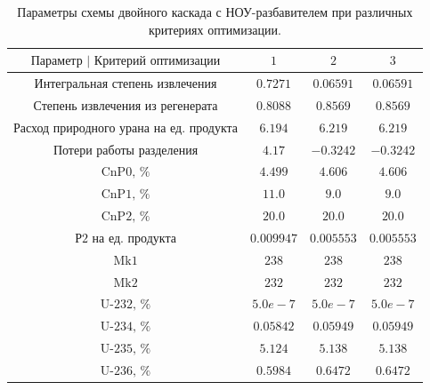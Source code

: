 \begin{table}
    \begin{tabular}{cccc}
        $\text{Параметр | Критерий оптимизации}$ & $\text{1}$ & $\text{2}$ & $\text{3}$\\ \hline
        $\text{Интегральная степень извлечения}$ & $0.7271$ & $0.06591$ & $0.06591$\\ \hline
        $\text{Степень извлечения из регенерата}$ & $0.8088$ & $0.8569$ & $0.8569$\\ \hline
        $\text{Расход природного урана на ед. продукта}$ & $6.194$ & $6.219$ & $6.219$\\ \hline
        $\text{Потери работы разделения}$ & $4.17$ & $-0.3242$ & $-0.3242$\\ \hline
        $\text{CnP0, \%}$ & $4.499$ & $4.606$ & $4.606$\\ \hline
        $\text{CnP1, \%}$ & $11.0$ & $9.0$ & $9.0$\\ \hline
        $\text{CnP2, \%}$ & $20.0$ & $20.0$ & $20.0$\\ \hline
        $\text{Р2 на ед. продукта}$ & $0.009947$ & $0.005553$ & $0.005553$\\ \hline
        $\text{Mk1}$ & $238$ & $238$ & $238$\\ \hline
        $\text{Mk2}$ & $232$ & $232$ & $232$\\ \hline
        $\text{U-232, \%}$ & $5.0e-7$ & $5.0e-7$ & $5.0e-7$\\ \hline
        $\text{U-234, \%}$ & $0.05842$ & $0.05949$ & $0.05949$\\ \hline
        $\text{U-235, \%}$ & $5.124$ & $5.138$ & $5.138$\\ \hline
        $\text{U-236, \%}$ & $0.5984$ & $0.6472$ & $0.6472$
        \end{tabular}
\caption{Параметры схемы двойного каскада с НОУ-разбавителем при различных критериях оптимизации.{\label{5opt2_20}}}
\end{table}

